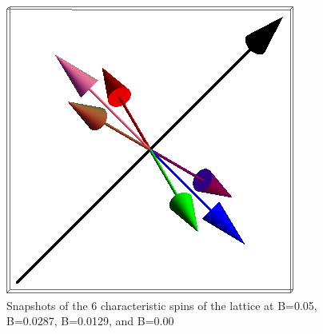 \documentclass{article}
\begin{document}
\begin{figure}[ht]
\includegraphics[scale=0.27]{501S005to000G.png}
\caption{Snapshots of the 6 characteristic spins of the lattice at B=0.05, B=0.0287, B=0.0129, and B=0.00}
\end{figure}
\pagebreak
\end{document}
